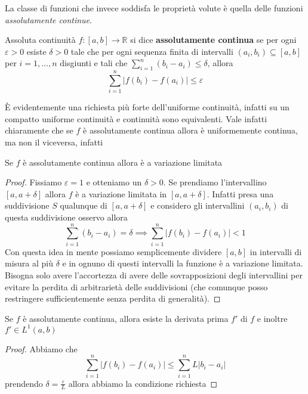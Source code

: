La classe di funzioni che invece soddisfa le proprietà volute è quella delle
funzioni \emph{assolutamente continue}.  
\begin{definition}{Assoluta continuità}
    \(f : [a, b] \to \mathbb{R}\)  si dice \textbf{assolutamente continua} se per ogni
    \(\varepsilon > 0\) esiste \(\delta > 0\) tale che per ogni sequenza finita
    di intervalli \({(a_{i}, b_{i})} \subseteq [a, b] \) per \(i = 1,\dots, n\)
    disgiunti e tali che \(\displaystyle\sum_{i=1}^{n} {(b_{i} - a_{i})} \le
    \delta  \), allora
\[
    \sum_{i=1}^{n} \left| f{(b_{i})} - f{(a_{i})} \right| \le \varepsilon 
\]
\end{definition}
È evidentemente una richiesta più forte dell'uniforme continuità, infatti su un
compatto uniforme continuità e continuità sono equivalenti. Vale infatti
chiaramente che se \(f\) è assolutamente continua allora è uniformemente
continua, ma non il viceversa, infatti
\begin{proposition}
    Se \(f\) è assolutamente continua allora è a variazione limitata
\end{proposition}
\begin{proof}
Fissiamo \(\varepsilon = 1\) e otteniamo un \(\delta > 0\). Se prendiamo
l'intervallino \([a, a+ \delta]\) allora \(f\) è a variazione limitata in \([a,
a+\delta]\). Infatti presa una suddivisione \(S\) qualunque di \([a,
a+\delta]\) e considero gli intervallini \({(a_{i}, b_{i})}\) di questa
suddivisione osservo allora
\[
    \sum_{i=1}^{n} {(b_{i} - a_{i})} = \delta \implies \sum_{i=1}^{n} \left|
    f{(b_{i})} - f{(a_{i})} \right| < 1
\]
Con questa idea in mente possiamo semplicemente dividere \([a,b]\) in intervalli
di misura al più \(\delta\) e in ognuno di questi intervalli la funzione è a
variazione limitata. Bisogna solo avere l'accortezza di avere delle
sovrapposizioni degli intervallini per evitare la perdita di arbitrarietà delle
suddivisioni (che comunque posso restringere sufficientemente senza perdita di
generalità). 
\end{proof}
\begin{proposition}
    Se \(f\) è assolutamente continua, allora esiste la derivata prima \(f'\) di
    \(f\) e inoltre \(f' \in L^{1}(a, b)\) 
\end{proposition}
\begin{proposition}
\end{proposition}
\begin{proof}
    Abbiamo che
\[
    \sum_{i=1}^{n} \left| f{(b_{i})} - f{(a_{i})} \right| \le \sum_{i=1}^{n} L
    |b_{i} - a_{i}|  
\]
    prendendo \(\delta = \frac{\varepsilon}{L}\) allora abbiamo la condizione
    richiesta
\end{proof}

